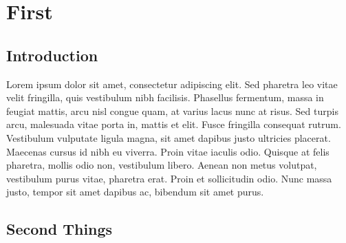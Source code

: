 \documentclass[../main.tex]{subfiles}
\begin{document}
\chapter{First}

\section{Introduction}
Lorem ipsum dolor sit amet, consectetur adipiscing elit. Sed pharetra leo vitae velit fringilla, quis vestibulum nibh facilisis. Phasellus fermentum, massa in feugiat mattis, arcu nisl congue quam, at varius lacus nunc at risus. Sed turpis arcu, malesuada vitae porta in, mattis et elit. Fusce fringilla consequat rutrum. Vestibulum vulputate ligula magna, sit amet dapibus justo ultricies placerat. Maecenas cursus id nibh eu viverra. Proin vitae iaculis odio. Quisque at felis pharetra, mollis odio non, vestibulum libero. Aenean non metus volutpat, vestibulum purus vitae, pharetra erat. Proin et sollicitudin odio. Nunc massa justo, tempor sit amet dapibus ac, bibendum sit amet purus.\cite{mrx05}

\section{Second Things}
\end{document}
